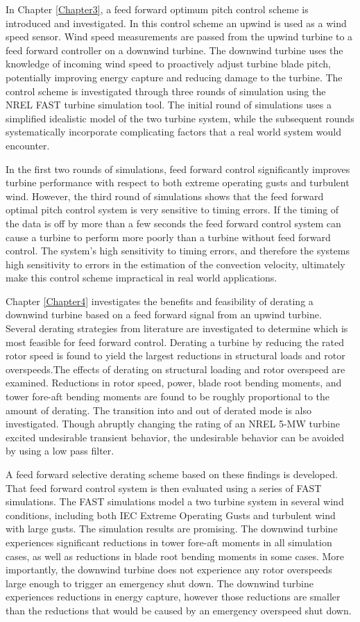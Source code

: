 In Chapter \ref{Chapter3}, a feed forward optimum pitch control scheme is introduced and investigated. In this control scheme an upwind is used as a wind speed sensor. Wind speed measurements are passed from the upwind turbine to a feed forward controller on a downwind turbine. The downwind turbine uses the knowledge of incoming wind speed to proactively adjust turbine blade pitch, potentially improving energy capture and reducing damage to the turbine. The control scheme is investigated through three rounds of simulation using the NREL FAST turbine simulation tool. The initial round of simulations uses a simplified idealistic model of the two turbine system, while the subsequent rounds systematically incorporate complicating factors that a real world system would encounter.  

In the first two rounds of simulations, feed forward control significantly improves turbine performance with respect to both extreme operating gusts and turbulent wind. However, the third round of simulations shows that the feed forward optimal pitch control system is very sensitive to timing errors. If the timing of the data is off by more than a few seconds the feed forward control system can cause a turbine to perform more poorly than a turbine without feed forward control. The system's high sensitivity to timing errors, and therefore the systems high sensitivity to errors in the estimation of the convection velocity, ultimately make this control scheme impractical in real world applications.

Chapter \ref{Chapter4} investigates the benefits and feasibility of derating a downwind turbine based on a feed forward signal from an upwind turbine. Several derating strategies from literature are investigated to determine which is most feasible for feed forward control. Derating a turbine by reducing the rated rotor speed is found to yield the largest reductions in structural loads and rotor overspeeds.The effects of derating on structural loading and rotor overspeed are examined. Reductions in rotor speed, power, blade root bending moments, and tower fore-aft bending moments are found to be roughly proportional to the amount of derating. The transition into and out of derated mode is also investigated. Though abruptly changing the rating of an NREL 5-MW turbine excited undesirable transient behavior, the undesirable behavior can be avoided by using a low pass filter. 

A feed forward selective derating scheme based on these findings is developed. That feed forward control system is then evaluated using a series of FAST simulations. The FAST simulations model a two turbine system in several wind conditions, including both IEC Extreme Operating Gusts and turbulent wind with large gusts. The simulation results are promising. The downwind turbine experiences significant reductions in tower fore-aft moments in all simulation cases, as well as reductions in blade root bending moments in some cases. More importantly, the downwind turbine does not experience any rotor overspeeds large enough to trigger an emergency shut down. The downwind turbine experiences reductions in energy capture, however those reductions are smaller than the reductions that would be caused by an emergency overspeed shut down.
  
